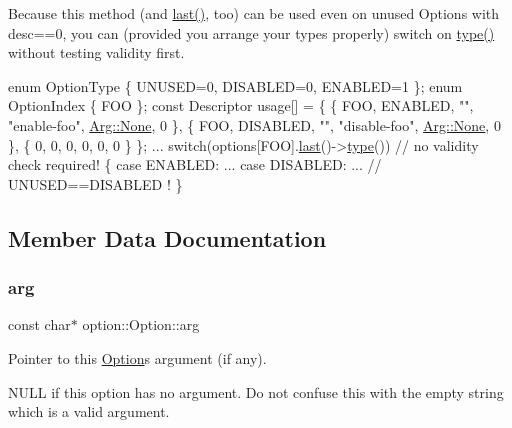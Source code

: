 Because this method (and \hyperlink{classoption_1_1_option_afe2aff68191e55b59c53fac3dbbcd7c3}{last()}, too) can be used even on unused Options with desc==0, you can (provided you arrange your types properly) switch on \hyperlink{classoption_1_1_option_a5268a69e1a91137186ab772574296da0}{type()} without testing validity first. 
\begin{DoxyCode}
\textcolor{keyword}{enum} OptionType \{ UNUSED=0, DISABLED=0, ENABLED=1 \};
\textcolor{keyword}{enum} OptionIndex \{ FOO \};
\textcolor{keyword}{const} Descriptor usage[] = \{
  \{ FOO, ENABLED,  \textcolor{stringliteral}{""}, \textcolor{stringliteral}{"enable-foo"},  \hyperlink{structoption_1_1_arg_a7fc01987899c91c6b6a1be5711a46e22}{Arg::None}, 0 \},
  \{ FOO, DISABLED, \textcolor{stringliteral}{""}, \textcolor{stringliteral}{"disable-foo"}, \hyperlink{structoption_1_1_arg_a7fc01987899c91c6b6a1be5711a46e22}{Arg::None}, 0 \},
  \{ 0, 0, 0, 0, 0, 0 \} \};
...
switch(options[FOO].\hyperlink{classoption_1_1_option_afe2aff68191e55b59c53fac3dbbcd7c3}{last}()->\hyperlink{classoption_1_1_option_a5268a69e1a91137186ab772574296da0}{type}()) \textcolor{comment}{// no validity check required!}
\{
  \textcolor{keywordflow}{case} ENABLED: ...
  \textcolor{keywordflow}{case} DISABLED: ...  \textcolor{comment}{// UNUSED==DISABLED !}
\}
\end{DoxyCode}
 

\subsection{Member Data Documentation}
\mbox{\label{classoption_1_1_option_a402be734987458364b0f473acae36238}} 
\subsubsection{\texorpdfstring{arg}{arg}}
{\footnotesize\ttfamily const char$\ast$ option\+::\+Option\+::arg}



Pointer to this \hyperlink{classoption_1_1_option}{Option}\textquotesingle{}s argument (if any). 

N\+U\+LL if this option has no argument. Do not confuse this with the empty string which is a valid argument. \mbox{\label{classoption_1_1_option_af8d664a7b5de1425008b1812a90a0c23}} 
